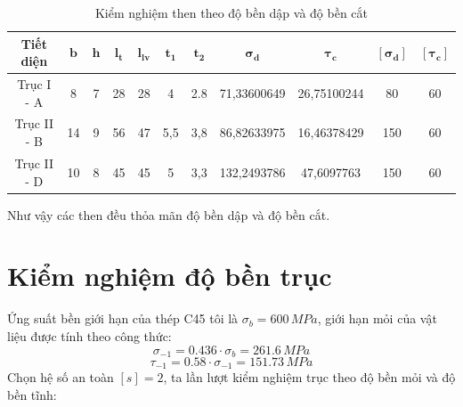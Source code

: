 \begin{table}[h!]
\centering
\begin{tabular}{|c|c|c|c|c|c|c|c|c|c|c|}
\hline
\textbf{Tiết diện} & $\mathbf{b}$ & $\mathbf{h}$ & $\mathbf{l_t}$ & $\mathbf{l_{lv}}$ & $\mathbf{t_1}$ & $\mathbf{t_2}$ & $\mathbf{\sigma_d}$ & $\mathbf{\tau_c}$ & $\mathbf{[\sigma_d]}$ & $\mathbf{[\tau_c]}$ \\
\hline
Trục I - A & 8 & 7 & 28 & 28 & 4 & 2.8 & 71,33600649 & 26,75100244 & 80 & 60 \\
\hline
Trục II - B & 14 & 9 & 56 & 47 & 5,5 & 3,8 & 86,82633975 & 16,46378429 & 150 & 60 \\
\hline
Trục II - D & 10 & 8 & 45 & 45 & 5 & 3,3 & 132,2493786 & 47,6097763 & 150 & 60 \\
\hline
\end{tabular}
\caption{Kiểm nghiệm then theo độ bền dập và độ bền cắt}
\end{table}

\noindent Như vậy các then đều thỏa mãn độ bền dập và độ bền cắt.
\section{Kiểm nghiệm độ bền trục}
\noindent Ứng suất bền giới hạn của thép C45 tôi là $\sigma_b = 600 \, MPa$, giới hạn mỏi của vật liệu được tính theo công thức:
\begin{equation}
    \sigma_{-1} = 0.436 \cdot \sigma_b = 261.6 \, MPa
\end{equation}
\begin{equation}
    \tau_{-1} = 0.58 \cdot \sigma_{-1} = 151.73 \, MPa
\end{equation}
\noindent Chọn hệ số an toàn $[s] = 2$, ta lần lượt kiểm nghiệm trục theo độ bền mỏi và độ bền tĩnh:

